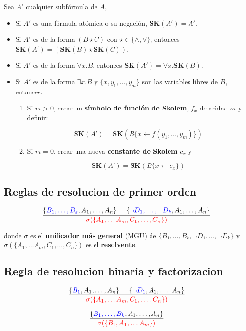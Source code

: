 \documentclass[10pt,a4paper]{article}
\begin{document}
Sea $A'$ cualquier subfórmula de $A$, 
\begin{itemize}
\item Si $A'$ es una fórmula atómica o su negación, \textbf{SK}$(A') = A'$.
\item Si $A'$ es de la forma $(B\star C)$ con $\star \in \{\land,\lor\}$, entonces $\textbf{SK}(A') = (\textbf{SK}(B)\star \textbf{SK}(C))$.
\item Si $A'$ es de la forma $\forall x.B$, entonces $\textbf{SK}(A') = \forall x.\textbf{SK}(B)$.
\item Si $A'$ es de la forma $\exists x.B$ y $\{x,y_1,\dots,y_m\}$ son las variables libres de $B$, entonces:
\begin{enumerate}
\item Si $m>0$, crear un \textbf{símbolo de función de Skolem}, $f_x$ de aridad $m$ y definir:

$$\textbf{SK}(A') = \textbf{SK}(B\{ x \leftarrow f(y_1,\dots,y_m)\})$$

\item Si $m=0$, crear una nueva \textbf{constante de Skolem} $c_x$ y

$$\textbf{SK}(A') = \textbf{SK}(B\{ x \leftarrow c_x\})$$

\end{enumerate}
\end{itemize}

\subsection{Reglas de resolucion de primer orden}
$$\frac{\{\color{blue}B_1,\dots,B_k\color{black},A_1,\dots,A_n\}\hspace*{5mm}\{\color{blue}\lnot D_1,\dots,\lnot D_k\color{black},A_1,\dots,A_n\}}{{\color{red}\sigma(\{A_1,\dots A_m, C_1,\dots,C_n\})}}$$

donde $\sigma$ es el \textbf{unificador más general} (MGU) de $\{B_1,\dots,B_k,\lnot D_1,\dots,\lnot D_k\}$ y \\ $\sigma(\{A_1,\dots A_m, C_1,\dots,C_n\})$ es el \textbf{resolvente}.

\subsection{Regla de resolucion binaria y factorizacion}
$$\frac{\{\color{blue}B_1\color{black},A_1,\dots,A_n\}\hspace*{5mm}\{\color{blue}\lnot D_1\color{black},A_1,\dots,A_n\}}{{\color{red}\sigma(\{A_1,\dots A_m, C_1,\dots,C_n\})}}$$

$$\frac{\{\color{blue}B_1,\dots,B_k\color{black},A_1,\dots,A_n\}}{{\color{red}\sigma(\{B_1,A_1,\dots A_m\})}}$$
\end{document}
